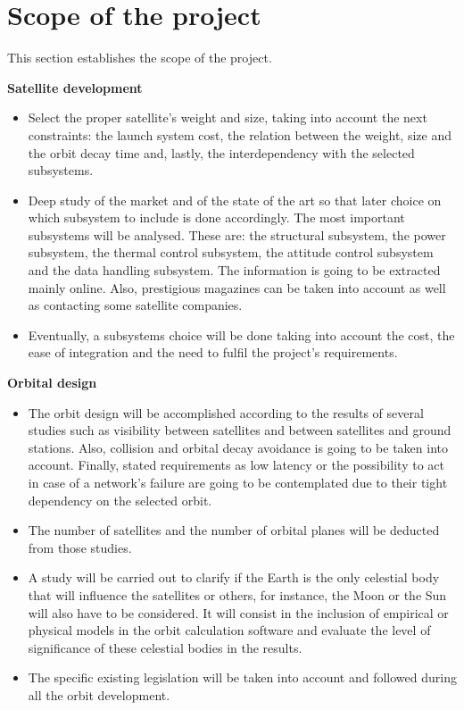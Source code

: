\chapter{Scope of the project}
This section establishes the scope of the project.

{\bfseries Satellite development} 
\begin{itemize}
	\item Select the proper satellite's weight and size, taking into account the next constraints: the launch system cost, the relation between the weight, size and the orbit decay time and, lastly, the interdependency with the selected subsystems.
	\item Deep study of the market and of the state of the art so that later choice on which subsystem to include is done accordingly. The most important subsystems will be analysed. These are: the structural subsystem, the power subsystem, the thermal control subsystem, the attitude control subsystem and the data handling subsystem. The information is going to be extracted mainly online. Also, prestigious magazines can be taken into account as well as contacting some satellite companies.
	\item Eventually, a subsystems choice will be done taking into account the cost, the ease of integration and the need to fulfil the project's requirements.
\end{itemize}

{\bfseries Orbital design}

\begin{itemize}
	\item The orbit design will be accomplished according to the results of several studies such
as visibility between satellites and between satellites and ground stations. Also, collision
and orbital decay avoidance is going to be taken into account. Finally, stated requirements as low latency or the possibility to act in case of a network's failure are going to be contemplated due to their tight dependency on the selected orbit.
	\item The number of satellites and the number of orbital planes will be deducted from those
studies.
	\item A study will be carried out to clarify if the Earth is the only celestial body that will
influence the satellites or others, for instance, the Moon or the Sun will also have to
be considered. It will consist in the inclusion of empirical or physical models in the orbit calculation software and evaluate the level of significance of these celestial bodies in the results. 
	\item The specific existing legislation will be taken into  account and followed during all
the orbit development.

\end{itemize}


